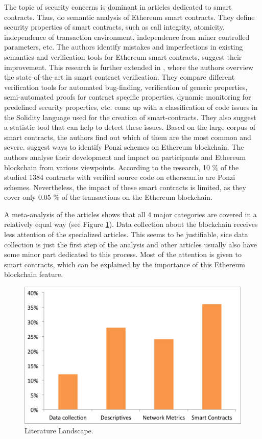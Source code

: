 The topic of security concerns is dominant in articles dedicated to smart contracts. 
Thus, \cite{grishchenko2018semantic} do semantic analysis of Ethereum smart contracts. 
They define security properties of smart contracts, such as call integrity, atomicity, independence of transaction environment, independence from miner controlled parameters, etc.
The authors identify mistakes and imperfections in existing semantics and verification tools for Ethereum smart contracts, suggest their improvement.
This research is further extended in \cite{grishchenko2018foundations}, where the authors overview the state-of-the-art in smart contract verification.
They compare different verification tools for automated bug-finding, verification of generic properties, semi-automated proofs for contract specific properties, dynamic monitoring for predefined security properties, etc.
\cite{tikhomirov2018smartcheck} come up with a classification of code issues in the Solidity language used for the creation of smart-contracts. 
They also suggest a statistic tool that can help to detect these issues.
Based on the large corpus of smart contracts, the authors find out which of them are the most common and severe.
\cite{bartoletti2017dissecting} suggest ways to identify Ponzi schemes on Ethereum blockchain. 
The authors analyse their development and impact on participants and Ethereum blockchain from various viewpoints. 
According to the research, 10 \% of the studied 1384 contracts with verified source code
on etherscan.io are Ponzi schemes. 
Nevertheless, the impact of these smart contracts is limited, as they cover only 0.05 \% of the transactions on the Ethereum blockchain.


A meta-analysis of the articles shows that all 4 major categories are covered in a relatively equal way (see Figure \ref{fig:literature}).
Data collection about the blockchain receives less attention of the specialized articles.
This seems to be justifiable, sice data collection is just the first step of the analysis and other articles usually also have some minor part dedicated to this process.
Most of the attention is given to smart contracts, which can be explained by the importance of this Ethereum blockchain feature.

\begin{figure}[h]
  \centering
  \includegraphics[width=\linewidth]{figures/literature.png}
  \caption{Literature Landscape.}
  \label{fig:literature}
\end{figure}

